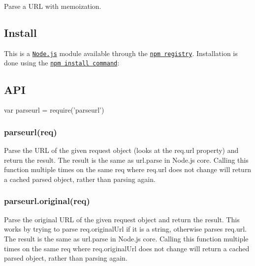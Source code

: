 \href{https://npmjs.org/package/parseurl}{\tt } \href{https://npmjs.org/package/parseurl}{\tt } \href{https://nodejs.org/en/download/}{\tt } \href{https://travis-ci.org/pillarjs/parseurl}{\tt } \href{https://coveralls.io/r/pillarjs/parseurl?branch=master}{\tt }

Parse a U\+RL with memoization.

\subsection*{Install}

This is a \href{https://nodejs.org/en/}{\tt Node.\+js} module available through the \href{https://www.npmjs.com/}{\tt npm registry}. Installation is done using the \href{https://docs.npmjs.com/getting-started/installing-npm-packages-locally}{\tt {\ttfamily npm install} command}\+:




\subsection*{A\+PI}


\begin{DoxyCode}
var parseurl = require('parseurl')
\end{DoxyCode}


\subsubsection*{parseurl(req)}

Parse the U\+RL of the given request object (looks at the {\ttfamily req.\+url} property) and return the result. The result is the same as {\ttfamily url.\+parse} in Node.\+js core. Calling this function multiple times on the same {\ttfamily req} where {\ttfamily req.\+url} does not change will return a cached parsed object, rather than parsing again.

\subsubsection*{parseurl.\+original(req)}

Parse the original U\+RL of the given request object and return the result. This works by trying to parse {\ttfamily req.\+original\+Url} if it is a string, otherwise parses {\ttfamily req.\+url}. The result is the same as {\ttfamily url.\+parse} in Node.\+js core. Calling this function multiple times on the same {\ttfamily req} where {\ttfamily req.\+original\+Url} does not change will return a cached parsed object, rather than parsing again.

